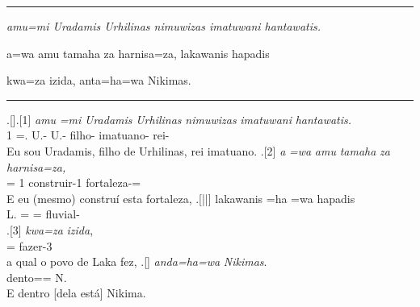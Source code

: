 \vspace{10pt}
\hrule
\vspace{10pt}


\setcounter{parcount}{0}
\begin{parnumbersa}[]

	\raggedright%
	\itshape%
	amu=mi Uradamis Urhilinas nimuwizas imatuwani hantawatis.

	a=wa amu tamaha za harnisa=za, lakawanis hapadis

	kwa=za izida, anta=ha=wa Nikimas.


\end{parnumbersa}

\vspace{10pt}
\hrule
\vspace{20pt}

\ex.[]\ag.[1] \emph{amu} \emph{=mi} \emph{Uradamis} \emph{Urhilinas}
\emph{nimuwizas} \emph{imatuwani} \emph{hantawatis.}\\
\Pro{}1\Sg{} =\Refl{}. U.-\Com{}\Nom{}\Sg{} U.-\Com{}\Gen{}\Sg{} filho-\Com{}\Nom{}\Sg{}
imatuano-\Com{}\Nom{}\Sg{} rei-\Com{}\Nom{}\Sg{}\\
Eu sou Uradamis, filho de Urhilinas, rei imatuano.
\bg.[2] \emph{a} \emph{=wa} \emph{amu} \emph{tamaha} \emph{za} \emph{harnisa=za,}\\
\Conj{} =\Clt{} \Pro{}1\Sg{} construir-1\Sg{}\Pret{} \Pro{}\Neut{}\Acu{}\Sg{}
fortaleza-\Neut{}\Acu{}\Sg{}=\Clt{}\\
E eu (mesmo) construí esta fortaleza,
\bg.[||] lakawanis =ha =wa hapadis\\
L.\Com{}\Nom{}\Sg{} =\Conj{} =\Clt{} fluvial-\Com{}\Nom{}\Sg{}\\
\bg.[3] \emph{kwa=za} \emph{izida},\\
\Rel{}\Neut{}\Acu{}\Sg{}=\Clt{} fazer-3\Sg{}\Pret{}\\
a qual o povo de Laka fez,
\bg.[] \emph{anda=ha=wa} \emph{Nikimas}.\\
dento=\Conj{}=\Clt{} N.\Com{}\Nom{}\Sg{}\\
E dentro [dela está] Nikima.



